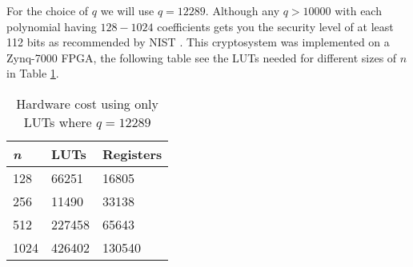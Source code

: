 For the choice of $q$ we will use $q = 12289$.
Although any $q > 10 000$ with each polynomial having $128 - 1024$ coefficients
gets you the security level of at least 112 bits as recommended by NIST
\citep{barker2006recommendation}. This cryptosystem was implemented on a
Zynq-7000 FPGA, the following table see the LUTs needed for different sizes of
$n$ in Table \ref{tab:hardwarecost}.

\begin{table}[H]
    \centering
    \begin{tabular}{l|ll}
        \textit{n} & LUTs   & Registers \\ \hline
        128        & 66251  & 16805     \\
        256        & 11490  & 33138     \\
        512        & 227458 & 65643     \\
        1024       & 426402 & 130540
    \end{tabular}
    \caption{Hardware cost using only LUTs where $q = 12289$
    \citep{FPGA_Post_Quantum_Primitives}}
    \label{tab:hardwarecost}
\end{table}

